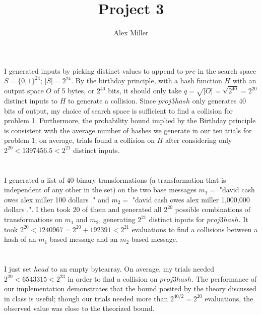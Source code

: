 \documentclass[]{article}
\title{Project 3}
\author{Alex Miller}
\begin{document}
\maketitle

\section{}
I generated inputs by picking distinct values to append to $pre$ in the search space $S = \{0,1\}^{24}$; $|S| = 2^{24}$. By the birthday principle, with a hash function $H$  with an output space $O$ of 5 bytes, or $2^{40}$ bits, it should only take $q = \sqrt{|O|} = \sqrt{2^{40}} = 2^{20}$ distinct inputs to $H$ to generate a collision. Since $proj3hash$ only generates 40 bits of output, my choice of search space is sufficient to find a collision for problem 1. Furthermore, the probability bound implied by the Birthday principle is consistent with the average number of hashes we generate in our ten trials for problem 1; on average, trials found a collision on $H$ after considering only $2^{20} < 1397456.5 < 2^{21}$ distinct inputs.

\section{}
I generated a list of 40 binary transformations (a transformation that is independent of any other in the set) on the two base messages $m_1 = $ "david cash owes alex miller 100 dollars ." and $m_2 = $ "david cash owes alex miller 1,000,000 dollars .". I then took $20$ of them and generated all $2^{20}$ possible combinations of transformations on $m_1$ and $m_2$, generating $2^{21}$ distinct inputs for $proj3hash$. It took $2^{20} < 1240967 = 2^{20} + 192391 < 2^{21}$ evaluations to find a collisions between a hash of an $m_1$ based message and an $m_2$ based message. 

\section{}
I just set $head$ to an empty bytearray. On average, my trials needed $2^{20} < 6543315 < 2^{23}$ in order to find a collision on $proj3hash$. The performance of our implementation demonstrates that the bound posited by the theory discussed in class is useful; though our trials needed more than $2^{40/2} = 2^{20}$ evaluations, the observed value was close to the theorized bound.
\end{document}
